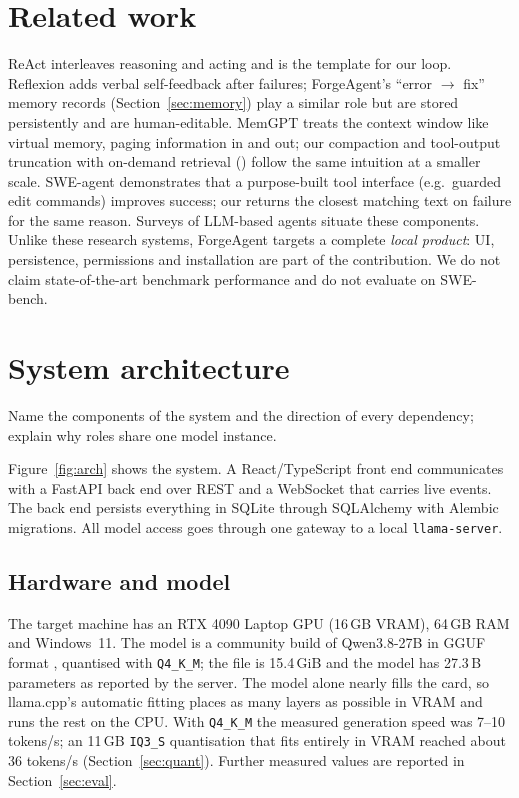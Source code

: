 \documentclass[11pt,a4paper]{article}
\newcommand{\code}[1]{\texttt{\detokenize{#1}}}
\begin{document}
\section{Related work}
ReAct \citep{yao2023react} interleaves reasoning and acting and is the template for our loop. Reflexion \citep{shinn2023reflexion} adds verbal self-feedback after failures; ForgeAgent's
``error $\rightarrow$ fix'' memory records (Section~\ref{sec:memory}) play a similar role but are stored persistently and are human-editable.
MemGPT \citep{packer2023memgpt} treats the context window like virtual memory, paging information in and out; our compaction and tool-output truncation with on-demand retrieval
(\code{read_full_output}) follow the same intuition at a smaller scale. SWE-agent \citep{yang2024sweagent} demonstrates that a purpose-built tool interface (e.g.\ guarded edit commands)
improves success; our \code{edit_file} returns the closest matching text on failure for the same reason. Surveys of LLM-based agents \citep{wang2024survey} situate these components.
Unlike these research systems, ForgeAgent targets a complete \emph{local product}: UI, persistence, permissions and installation are part of the contribution. We do not claim state-of-the-art
benchmark performance and do not evaluate on SWE-bench.

\section{System architecture}\label{sec:arch}
\begin{objectives}
Name the components of the system and the direction of every dependency; explain why roles share one model instance.
\end{objectives}

Figure~\ref{fig:arch} shows the system. A React/TypeScript front end communicates with a FastAPI \citep{fastapi} back end over REST and a WebSocket that carries live events.
The back end persists everything in SQLite \citep{sqlite} through SQLAlchemy \citep{bayer2012sqlalchemy} with Alembic migrations. All model access goes through one gateway to a local
\texttt{llama-server}.



\subsection{Hardware and model}\label{sec:hw}
The target machine has an RTX 4090 Laptop GPU (16\,GB VRAM), 64\,GB RAM and Windows~11. The model is a community build of Qwen3.8-27B in GGUF format
\citep{hfmodel,qwen3report}, quantised with \texttt{Q4\_K\_M}; the file is 15.4\,GiB and the model has 27.3\,B parameters as reported by the server.
The model alone nearly fills the card, so llama.cpp's automatic fitting places as many layers as possible in VRAM and runs the rest on the CPU.
With \texttt{Q4\_K\_M} the measured generation speed was 7--10 tokens/s; an 11\,GB \texttt{IQ3\_S} quantisation that fits entirely in VRAM reached about 36 tokens/s (Section~\ref{sec:quant}).
Further measured values are reported in Section~\ref{sec:eval}.
\end{document}
